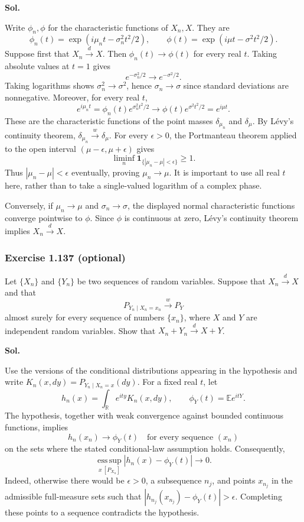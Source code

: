 \documentclass[lang=en,11pt,a4paper,citestyle=authoryear]{elegantpaper}
\newcommand{\R}{\mathbb{R}}
\newcommand{\E}{\mathbb{E}}
\begin{document}
\par\vspace{0.5em}\noindent\textbf{Sol.}\par
Write $\phi_n,\phi$ for the characteristic functions of $X_n,X$.
They are
\[
\phi_n(t)=\exp(i\mu_nt-\sigma_n^2t^2/2),\qquad
\phi(t)=\exp(i\mu t-\sigma^2t^2/2).
\]
Suppose first that $X_n\xrightarrow dX$. Then $\phi_n(t)\to\phi(t)$
for every real $t$. Taking absolute values at $t=1$ gives
\[
e^{-\sigma_n^2/2}\longrightarrow e^{-\sigma^2/2}.
\]
Taking logarithms shows $\sigma_n^2\to\sigma^2$, hence
$\sigma_n\to\sigma$ since standard deviations are nonnegative.
Moreover, for every real $t$,
\[
e^{i\mu_nt}=\phi_n(t)e^{\sigma_n^2t^2/2}
\longrightarrow\phi(t)e^{\sigma^2t^2/2}=e^{i\mu t}.
\]
These are the characteristic functions of the point masses
$\delta_{\mu_n}$ and $\delta_\mu$. By L\'evy's continuity theorem,
$\delta_{\mu_n}\xrightarrow w\delta_\mu$. For every $\epsilon>0$,
the Portmanteau theorem applied to the open interval
$(\mu-\epsilon,\mu+\epsilon)$ gives
\[
\liminf_n\mathbf1_{\{|\mu_n-\mu|<\epsilon\}}\ge1.
\]
Thus $|\mu_n-\mu|<\epsilon$ eventually, proving $\mu_n\to\mu$.
It is important to use all real $t$ here, rather than to take a
single-valued logarithm of a complex phase.

Conversely, if $\mu_n\to\mu$ and $\sigma_n\to\sigma$, the displayed
normal characteristic functions converge pointwise to $\phi$.
Since $\phi$ is continuous at zero, L\'evy's continuity theorem
implies $X_n\xrightarrow dX$.
\vspace{2em}

\subsubsection*{Exercise 1.137 (optional)}
Let $\{X_n\}$ and $\{Y_n\}$ be two sequences of random variables.
Suppose that $X_n\xrightarrow{d}X$ and that
\[
P_{Y_n\mid X_n=x_n}\xrightarrow{w}P_Y
\]
almost surely for every sequence of numbers $\{x_n\}$, where $X$
and $Y$ are independent random variables. Show that
$X_n+Y_n\xrightarrow{d}X+Y$.

\par\vspace{0.5em}\noindent\textbf{Sol.}\par
Use the versions of the conditional distributions appearing in the
hypothesis and write $K_n(x,dy)=P_{Y_n\mid X_n=x}(dy)$.
For a fixed real $t$, let
\[
h_n(x)=\int_{\R}e^{ity}K_n(x,dy),\qquad
\phi_Y(t)=\E e^{itY}.
\]
The hypothesis, together with weak convergence against bounded
continuous functions, implies
\[
h_n(x_n)\longrightarrow\phi_Y(t)
\quad\text{for every sequence }(x_n)
\]
on the sets where the stated conditional-law assumption holds.
Consequently,
\[
\operatorname*{ess\,sup}_{x\ [P_{X_n}]}
|h_n(x)-\phi_Y(t)|\longrightarrow0.
\]
Indeed, otherwise there would be $\epsilon>0$, a subsequence
$n_j$, and points $x_{n_j}$ in the admissible full-measure sets
such that $|h_{n_j}(x_{n_j})-\phi_Y(t)|>\epsilon$.
Completing these points to a sequence contradicts the hypothesis.
\end{document}
